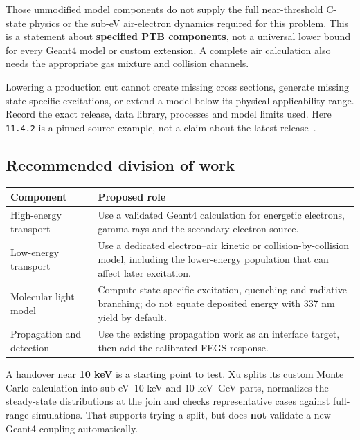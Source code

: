 \documentclass[11pt,a4paper]{article}
\newcommand{\xu}[1]{\cite[#1]{Xu2015}}
\begin{document}
Those unmodified model components do not supply the full near-threshold C-state physics or the sub-eV air-electron dynamics required for this problem. This is a statement about \textbf{specified PTB components}, not a universal lower bound for every Geant4 model or custom extension. A complete air calculation also needs the appropriate gas mixture and collision channels.

\begin{keybox}
Lowering a production cut cannot create missing cross sections, generate missing state-specific excitations, or extend a model below its physical applicability range. Record the exact release, data library, processes and model limits used. Here \texttt{11.4.2} is a pinned source example, not a claim about the latest release~\cite{G4Cuts,G4PTBExc,G4PTBEl}.
\end{keybox}

\subsection*{Recommended division of work}
\begin{center}
\begin{tabularx}{\textwidth}{@{}P{37mm}Y@{}}
\toprule
\textbf{Component} & \textbf{Proposed role}\\
\midrule
High-energy transport & Use a validated Geant4 calculation for energetic electrons, gamma rays and the secondary-electron source.\\
Low-energy transport & Use a dedicated electron--air kinetic or collision-by-collision model, including the lower-energy population that can affect later excitation.\\
Molecular light model & Compute state-specific excitation, quenching and radiative branching; do not equate deposited energy with 337 nm yield by default.\\
Propagation and detection & Use the existing propagation work as an interface target, then add the calibrated FEGS response.\\
\bottomrule
\end{tabularx}
\end{center}

A handover near \textbf{10 keV} is a starting point to test. Xu splits its custom Monte Carlo calculation into sub-eV--10 keV and 10 keV--GeV parts, normalizes the steady-state distributions at the join and checks representative cases against full-range simulations. That supports trying a split, but does \textbf{not} validate a new Geant4 coupling automatically.\xu{Sec.~2.1}
\end{document}
